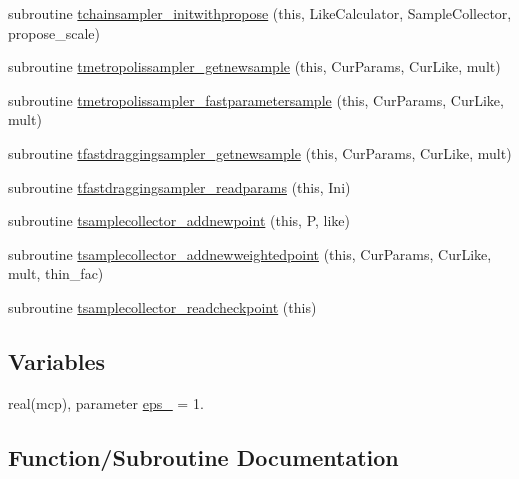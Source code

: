 \begin{DoxyCompactItemize}
\item 
subroutine \mbox{\hyperlink{namespacemontecarlo_ae01ead2e419d0e7cb8126beb7b6a1278}{tchainsampler\+\_\+initwithpropose}} (this, Like\+Calculator, Sample\+Collector, propose\+\_\+scale)
\item 
subroutine \mbox{\hyperlink{namespacemontecarlo_a8e8eb524291ad6abaafc4ec1cedaa916}{tmetropolissampler\+\_\+getnewsample}} (this, Cur\+Params, Cur\+Like, mult)
\item 
subroutine \mbox{\hyperlink{namespacemontecarlo_a52c8ac0f2608675d60fa454f684d0519}{tmetropolissampler\+\_\+fastparametersample}} (this, Cur\+Params, Cur\+Like, mult)
\item 
subroutine \mbox{\hyperlink{namespacemontecarlo_aabc2865a5460edaf007be6dca34d3eca}{tfastdraggingsampler\+\_\+getnewsample}} (this, Cur\+Params, Cur\+Like, mult)
\item 
subroutine \mbox{\hyperlink{namespacemontecarlo_a80c9edc811cd8126c1af36c89008a779}{tfastdraggingsampler\+\_\+readparams}} (this, Ini)
\item 
subroutine \mbox{\hyperlink{namespacemontecarlo_a2f05ea4c2552d9891ce8860f9befe96d}{tsamplecollector\+\_\+addnewpoint}} (this, P, like)
\item 
subroutine \mbox{\hyperlink{namespacemontecarlo_a23f6c5b28b5d65904c39f5a06efef97c}{tsamplecollector\+\_\+addnewweightedpoint}} (this, Cur\+Params, Cur\+Like, mult, thin\+\_\+fac)
\item 
subroutine \mbox{\hyperlink{namespacemontecarlo_afee20ae5c3f0b391ff0c231302a113a0}{tsamplecollector\+\_\+readcheckpoint}} (this)
\end{DoxyCompactItemize}
\subsection*{Variables}
\begin{DoxyCompactItemize}
\item 
real(mcp), parameter \mbox{\hyperlink{namespacemontecarlo_ac87b0e5ba62e656a1e0d3317a890c0d9}{eps\+\_}} = 1.
\end{DoxyCompactItemize}


\subsection{Function/\+Subroutine Documentation}
\mbox{\label{namespacemontecarlo_acea9a6722742a39deefda7f94ecd49bb}} 
